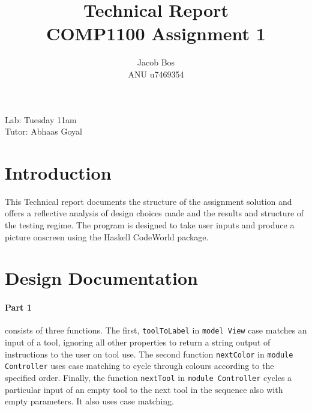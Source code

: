 \documentclass[11pt]{article}
\title{Technical Report\\ COMP1100 Assignment 1}
\author{Jacob Bos\\ ANU u7469354}
\begin{document}
\maketitle
{}
\begin{center}
  Lab: Tuesday 11am\\
  Tutor: Abhaas Goyal
\end{center}
\tableofcontents
\newpage
{}
\section{Introduction} 
This Technical report documents the structure of the assignment solution and offers a reflective analysis of design choices made and the results and structure of the testing regime. The program is designed to take user inputs and produce a picture onscreen using the Haskell CodeWorld package. %


\section{Design Documentation}%

\paragraph{Part 1} consists of three functions. The first, \verb|toolToLabel| in \verb|model View| case matches an input of a tool, ignoring all other properties to return a string output of instructions to the user on tool use. The second function \verb|nextColor| in \verb|module Controller| uses case matching to cycle through colours according to the specified order. Finally, the function \verb|nextTool| in \verb|module Controller| cycles a particular input of an empty tool to the next tool in the sequence also with empty parameters. It also uses case matching.
\end{document}

